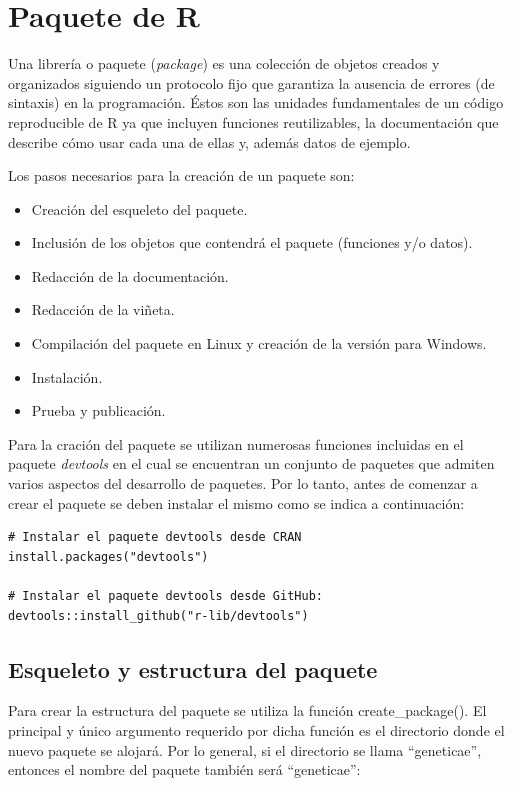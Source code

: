 \section{Paquete de R}

Una librería o paquete (\emph{package}) es una colección de objetos creados y organizados siguiendo un protocolo fijo que garantiza la ausencia de errores (de sintaxis) en la programación. Éstos son las unidades fundamentales de un código reproducible de R ya que incluyen funciones reutilizables, la documentación que describe cómo usar cada una de ellas y, además datos de ejemplo. 

Los pasos necesarios para la creación de un paquete son:
\begin{itemize}
\item Creación del esqueleto del paquete.
\item Inclusión de los objetos que contendrá el paquete (funciones y/o datos).
\item Redacción de la documentación.
\item Redacción de la viñeta.
\item Compilación del paquete en Linux y creación de la versión para Windows.
\item Instalación.
\item Prueba y publicación.
\end{itemize}


Para la cración del paquete se utilizan numerosas funciones incluidas en el paquete \emph{devtools} en el cual se encuentran un conjunto de paquetes que admiten varios aspectos del desarrollo de paquetes. Por lo tanto, antes de comenzar a crear el paquete se deben instalar el mismo como se indica a continuación:\\

\begin{lstlisting}
# Instalar el paquete devtools desde CRAN
install.packages("devtools")

# Instalar el paquete devtools desde GitHub:
devtools::install_github("r-lib/devtools")
\end{lstlisting}

\subsection{Esqueleto y estructura del paquete}

Para crear la estructura del paquete se utiliza la función create\_package(). El principal y único argumento requerido por dicha función es el directorio donde el nuevo paquete se alojará. Por lo general, si el directorio se llama ``geneticae'', entonces el nombre del paquete también será ``geneticae'':


